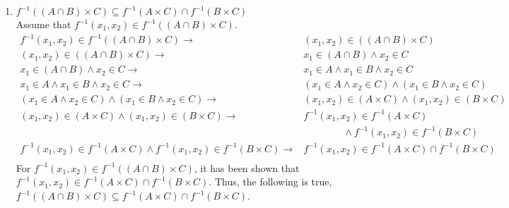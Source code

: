 \documentclass[12pt]{article}
\begin{document}
\renewcommand{\theenumi}{\roman{enumi}}
\begin{enumerate}
    \item{$f^{-1}((A \cap B) \times C) \subseteq f^{-1}(A \times C) \cap f^{-1}(B \times C)$ \\ Assume that $f^{-1}(x_1, x_2) \in f^{-1}((A \cap B) \times C)$.
    \begin{equation*}
    \begin{split}
        f^{-1}(x_1, x_2) \in f^{-1}((A \cap B) \times C) \rightarrow & (x_1, x_2) \in ((A \cap B) \times C)\\
        (x_1, x_2) \in ((A \cap B) \times C) \rightarrow & x_1 \in (A \cap B) \land x_2 \in C\\
        x_1 \in (A \cap B) \land x_2 \in C \rightarrow & x_1 \in A \land x_1 \in B \land x_2 \in C\\
        x_1 \in A \land x_1 \in B \land x_2 \in C \rightarrow & (x_1 \in A \land x_2 \in C) \land (x_1 \in B \land x_2 \in C)\\
        (x_1 \in A \land x_2 \in C) \land (x_1 \in B \land x_2 \in C) \rightarrow & (x_1, x_2) \in (A \times C) \land (x_1, x_2) \in (B \times C)\\
        (x_1, x_2) \in (A \times C) \land (x_1, x_2) \in (B \times C) \rightarrow & f^{-1}(x_1, x_2) \in f^{-1}(A \times C) \\ & \qquad \qquad \land f^{-1}(x_1, x_2) \in f^{-1}(B \times C)\\
        f^{-1}(x_1, x_2) \in f^{-1}(A \times C) \land f^{-1}(x_1, x_2) \in f^{-1}(B \times C) \rightarrow & f^{-1}(x_1, x_2) \in f^{-1}(A \times C) \cap f^{-1}(B \times C)\\
    \end{split}
    \end{equation*}}
    For $f^{-1}(x_1, x_2) \in f^{-1}((A \cap B) \times C)$, it has been shown that $f^{-1}(x_1, x_2) \in f^{-1}(A \times C) \cap f^{-1}(B \times C)$. Thus, the following is true, $f^{-1}((A \cap B) \times C) \subseteq f^{-1}(A \times C) \cap f^{-1}(B \times C)$.
    

\end{enumerate}
\end{document}
